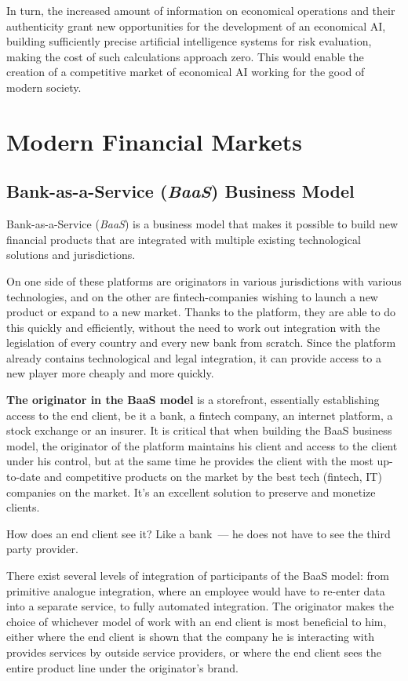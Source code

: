 \documentclass{article}
\begin{document}
\begin{multicols}{2}
In turn, the increased amount of information on economical operations and their authenticity grant new opportunities for the development of an economical AI, building sufficiently precise artificial intelligence systems for risk evaluation, making the cost of such calculations approach zero. This would enable the creation of a competitive market of economical AI working for the good of modern society. 

\section{Modern Financial Markets}

\subsection{Bank-as-a-Service (\textit{BaaS}) Business Model}

Bank-as-a-Service (\textit{BaaS}) is a business model that makes it possible to build new financial products that are integrated with multiple existing technological solutions and jurisdictions. 

On one side of these platforms are originators in various jurisdictions with various technologies, and on the other are fintech-companies wishing to launch a new product or expand to a new market. Thanks to the platform, they are able to do this quickly and efficiently, without the need to work out integration with the legislation of every country and every new bank from scratch. Since the platform already contains technological and legal integration, it can provide access to a new player more cheaply and more quickly. 

\textbf{The originator in the BaaS model} is a storefront, essentially establishing access to the end client, be it a bank, a fintech company, an internet platform, a stock exchange or an insurer. It is critical that when building the BaaS business model, the originator of the platform maintains his client and access to the client under his control, but at the same time he provides the client with the most up-to-date and competitive products on the market by the best tech (fintech, IT) companies on the market. It’s an excellent solution to preserve and monetize clients.

How does an end client see it? Like a bank~--- he does not have to see the third party provider.

There exist several levels of integration of participants of the BaaS model: from primitive analogue integration, where an employee would have to re-enter data into a separate service, to fully automated integration. The originator makes the choice of whichever model of work with an end client is most beneficial to him, either where the end client is shown that the company he is interacting with provides services by outside service providers, or where the end client sees the entire product line under the originator’s brand.


\end{multicols}
\end{document}
